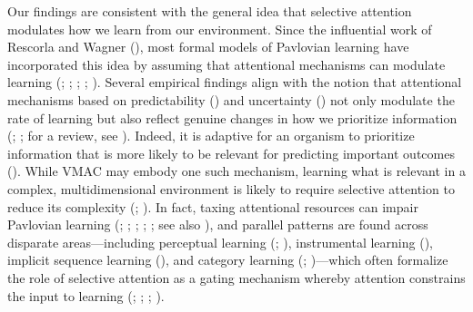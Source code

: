 \documentclass[
  man,
  floatsintext,
  longtable,
  nolmodern,
  notxfonts,
  notimes,
  mask,
  colorlinks=true,linkcolor=blue,citecolor=blue,urlcolor=blue]{apa7}
\begin{document}
Our findings are consistent with the general idea that selective
attention modulates how we learn from our environment. Since the
influential work of Rescorla and Wagner
(), most formal models of Pavlovian
learning have incorporated this idea by assuming that attentional
mechanisms can modulate learning (; ;
;
;
). Several empirical
findings align with the notion that attentional mechanisms based on
predictability () and
uncertainty () not only
modulate the rate of learning but also reflect genuine changes in how we
prioritize information (; ; for a
review, see ).
Indeed, it is adaptive for an organism to prioritize information that is
more likely to be relevant for predicting important outcomes
(). While VMAC may embody one such mechanism, learning what
is relevant in a complex, multidimensional environment is likely to
require selective attention to reduce its complexity
(;
). In fact, taxing
attentional resources can impair Pavlovian learning
(;
;
;
; ; see also ), and parallel patterns are found across disparate
areas---including perceptual learning
(;
), instrumental
learning (), implicit sequence learning
(), and category
learning (;
)---which often
formalize the role of selective attention as a gating mechanism whereby
attention constrains the input to learning
(;
;
;
).
\end{document}
